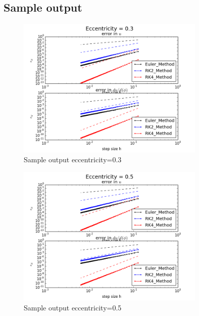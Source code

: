 \documentclass[12pt]{article}
\begin{document}
\subsection{Sample output}
\begin{figure}[h!]
	\begin{center}
		\includegraphics[width=0.8\textwidth]{error_ecc03.png}
		\caption{Sample output eccentricity=0.3}
		\label{fig1}
	\end{center}
\end{figure}
\begin{figure}[h!]
	\begin{center}
		\includegraphics[width=0.8\textwidth]{error_ecc05.png}
		\caption{Sample output eccentricity=0.5}
		\label{fig2}
	\end{center}
\end{figure}
\end{document}
